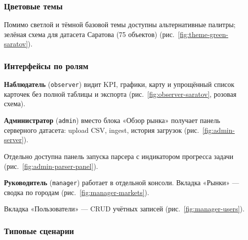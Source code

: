 
\subsubsection{Цветовые темы}

Помимо светлой и тёмной базовой темы доступны альтернативные палитры; зелёная схема для датасета Саратова (75 объектов) (рис.~\ref{fig:theme-green-saratov}).


\subsubsection{Интерфейсы по ролям}

\textbf{Наблюдатель} (\texttt{observer}) видит KPI, графики, карту и упрощённый список карточек без полной таблицы и экспорта (рис.~\ref{fig:observer-saratov}, розовая схема).


\textbf{Администратор} (\texttt{admin}) вместо блока «Обзор рынка» получает панель серверного датасета: upload CSV, ingest, история загрузок (рис.~\ref{fig:admin-server}).


Отдельно доступна панель запуска парсера с индикатором прогресса задачи (рис.~\ref{fig:admin-parser-panel}).


\textbf{Руководитель} (\texttt{manager}) работает в отдельной консоли. Вкладка «Рынки» --- сводка по городам (рис.~\ref{fig:manager-markets}).


Вкладка «Пользователи» --- CRUD учётных записей (рис.~\ref{fig:manager-users}).


\subsubsection{Типовые сценарии}

